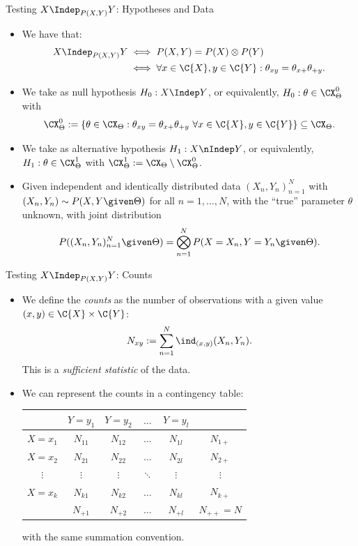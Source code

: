 \begin{frame}{Testing $X \Indep_{P(X,Y)} Y$: Hypotheses and Data}
  \begin{itemize}
    \item We have that:
  \begin{equation*}\begin{split}
    X \Indep_{P(X,Y)} Y & \iff P(X,Y) = P(X) \otimes P(Y) \\
                        & \iff \forall x \in \C{X}, y \in \C{Y}: \theta_{xy} = \theta_{x+} \theta_{+ y}.
  \end{split}\end{equation*}
    \item We take as null hypothesis $H_0 : X \Indep Y$, or equivalently, $H_0 : \theta \in \CX_\Theta^0$
      with 
      $$\CX_\Theta^0 := \{\theta \in \CX_\Theta : \theta_{xy} = \theta_{x+} \theta_{+ y} \ \forall x\in\C{X},y\in\C{Y} \} \subseteq \CX_\Theta.$$
    \item We take as alternative hypothesis $H_1 : X \nIndep Y$, or equivalently, $H_1 : \theta \in \CX_\Theta^1$ with $\CX_\Theta^1 := \CX_\Theta \setminus \CX_\Theta^0$.
    \item Given independent and identically distributed data $(X_n,Y_n)_{n=1}^N$ with
      $(X_n,Y_n) \sim P(X,Y \given \Theta)$ for all $n=1,\dots,N$, with the ``true'' parameter $\theta$ unknown,
      with joint distribution
      $$P((X_n,Y_n)_{n=1}^N \given \Theta) = \bigotimes_{n=1}^N P(X=X_n,Y=Y_n \given \Theta).$$
  \end{itemize}
\end{frame}

\begin{frame}{Testing $X \Indep_{P(X,Y)} Y$: Counts}
  \begin{itemize}
    \item We define the \emph{counts} as the number of observations with a given value $(x,y)\in\C{X}\times\C{Y}$:
$$N_{xy} := \sum_{n=1}^N \ind_{(x,y)}(X_n,Y_n).$$
      This is a \emph{sufficient statistic} of the data.
\item We can represent the counts in a contingency table:
\begin{center}\small\begin{tabular}{c|cccc|c}
  & $Y=y_1$         & $Y=y_2$ & $\dots$ & $Y=y_l$ \\
  \hline
  $X=x_1$ & $N_{11}$      & $N_{12}$      & $\dots$ & $N_{1l}$ & $N_{1+}$\\
  $X=x_2$ & $N_{21}$      & $N_{22}$      & $\dots$ & $N_{2l}$ & $N_{2+}$\\
  $\vdots$ & $\vdots$     & $\vdots$       & $\ddots$ & $\vdots$  & $\vdots$ \\
  $X=x_k$ & $N_{k1}$      & $N_{k2}$      & $\dots$ & $N_{kl}$ & $N_{k+}$ \\
  \hline
  & $N_{+ 1}$ & $N_{+ 2}$ & $\dots$ & $N_{+ l}$ & $N_{++} = N$\\
\end{tabular}\end{center}
with the same summation convention.
  \end{itemize}
\end{frame}

